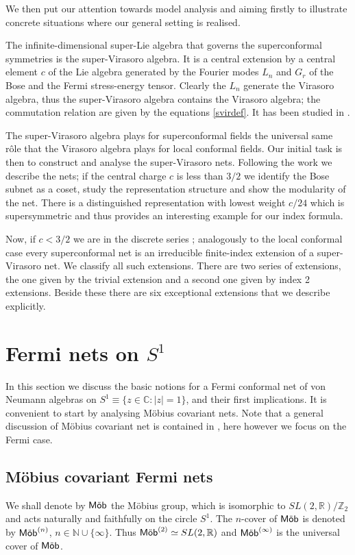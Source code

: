 \documentclass[11pt]{article}
\def\Mob{{\rm\textsf{M\"ob}}}
\def\Mobn{{\rm\textsf{M\"ob}}^{(n)}}
\def\Mobi{{\rm\textsf{M\"ob}}^{(\infty)}}
\begin{document}
We then put our attention towards model analysis and aiming firstly to illustrate concrete situations where our general setting is realised.

The infinite-dimensional super-Lie algebra that governs the superconformal symmetries is the super-Virasoro algebra. It is a central extension by a central element $c$ of the Lie algebra generated by the Fourier modes $L_n$ and $G_r$ of the Bose and the Fermi stress-energy tensor. Clearly the $L_n$ generate the Virasoro algebra, thus the super-Virasoro algebra contains the Virasoro algebra; the commutation relation are given by the equations \eqref{svirdef}. It has been studied in \cite{GKO, FQS}.

The super-Virasoro algebra plays for superconformal fields the universal same r\^ole that the Virasoro algebra plays for local conformal fields. Our initial task is then to construct and analyse the super-Virasoro nets. Following the work \cite{GKO} we describe the nets; if the central charge $c$ is less than $3/2$ we identify the Bose subnet as a coset, study the representation structure and show the modularity of the net. There is a distinguished representation with lowest weight $c/24$ which is supersymmetric and thus provides an interesting example for our index formula. 

Now, if $c<3/2$ we are in the discrete series \cite{FQS}; analogously to the local conformal case \cite{KL1} every superconformal net is an irreducible finite-index extension of a super-Virasoro net. We classify all such extensions. There are two series of extensions, the one given by the trivial extension and a second one given by index 2 extensions. Beside these there are six exceptional extensions that we describe explicitly.
%
\section{Fermi nets on $S^1$}
In this section we discuss the basic notions for a Fermi conformal net of von Neumann algebras on $S^1\equiv \{z\in\mathbb C: |z|=1\}$, and their first implications. It is convenient to start by analysing M\"obius covariant nets. Note that a general discussion of M\"obius covariant net is contained in \cite{DLR}, here however we focus on the Fermi case.
%
\subsection{M\"obius covariant Fermi nets}
\label{MobFermiNets}
%
We shall denote by $\Mob$ the M\"obius group, which is isomorphic to $SL(2,\mathbb R)/\mathbb Z_2$ and acts naturally and faithfully on the circle $S^1$. The $n$-cover of $\Mob$ is denoted by $\Mobn$, $n\in\mathbb N\cup\{\infty\}$. Thus $\Mob^{(2)}\simeq SL(2,\mathbb R)$ and $\Mobi$ is the universal cover of $\Mob$.
\end{document}
